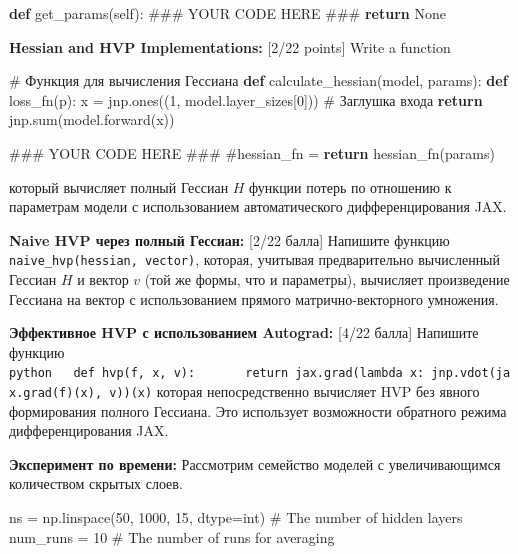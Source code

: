 \documentclass[
  russian,
  letterpaper,
  DIV=11,
  numbers=noendperiod]{scrartcl}
\newenvironment{Shaded}{\begin{snugshade}}{\end{snugshade}}
\newcommand{\AlertTok}[1]{\textcolor[rgb]{0.68,0.00,0.00}{#1}}
\newcommand{\BuiltInTok}[1]{\textcolor[rgb]{0.00,0.23,0.31}{#1}}
\newcommand{\CommentTok}[1]{\textcolor[rgb]{0.37,0.37,0.37}{#1}}
\newcommand{\ControlFlowTok}[1]{\textcolor[rgb]{0.00,0.23,0.31}{\textbf{#1}}}
\newcommand{\DecValTok}[1]{\textcolor[rgb]{0.68,0.00,0.00}{#1}}
\newcommand{\KeywordTok}[1]{\textcolor[rgb]{0.00,0.23,0.31}{\textbf{#1}}}
\newcommand{\NormalTok}[1]{\textcolor[rgb]{0.00,0.23,0.31}{#1}}
\newcommand{\OperatorTok}[1]{\textcolor[rgb]{0.37,0.37,0.37}{#1}}
\newcommand{\VariableTok}[1]{\textcolor[rgb]{0.07,0.07,0.07}{#1}}
\begin{document}
\begin{enumerate}
\begin{Shaded}
\begin{Highlighting}[]
    \KeywordTok{def}\NormalTok{ get\_params(}\VariableTok{self}\NormalTok{):}
        \CommentTok{\#\#\# YOUR CODE HERE }\AlertTok{\#\#\#}
        \ControlFlowTok{return} \VariableTok{None}
\end{Highlighting}
\end{Shaded}

  \textbf{Hessian and HVP Implementations:} {[}2/22 points{]} Write a
  function

\begin{Shaded}
\begin{Highlighting}[]
\CommentTok{\# Функция для вычисления Гессиана}
\KeywordTok{def}\NormalTok{ calculate\_hessian(model, params):}
    \KeywordTok{def}\NormalTok{ loss\_fn(p):}
\NormalTok{        x }\OperatorTok{=}\NormalTok{ jnp.ones((}\DecValTok{1}\NormalTok{, model.layer\_sizes[}\DecValTok{0}\NormalTok{]))  }\CommentTok{\# Заглушка входа}
        \ControlFlowTok{return}\NormalTok{ jnp.}\BuiltInTok{sum}\NormalTok{(model.forward(x))}

    \CommentTok{\#\#\# YOUR CODE HERE }\AlertTok{\#\#\#}
    \CommentTok{\#hessian\_fn =           }
    \ControlFlowTok{return}\NormalTok{ hessian\_fn(params)}
\end{Highlighting}
\end{Shaded}

  который вычисляет полный Гессиан \(H\) функции потерь по отношению к
  параметрам модели с использованием автоматического дифференцирования
  JAX.

  \textbf{Naive HVP через полный Гессиан:} {[}2/22 балла{]} Напишите
  функцию \texttt{naive\_hvp(hessian,\ vector)}, которая, учитывая
  предварительно вычисленный Гессиан \(H\) и вектор \(v\) (той же формы,
  что и параметры), вычисляет произведение Гессиана на вектор с
  использованием прямого матрично-векторного умножения.

  \textbf{Эффективное HVP с использованием Autograd:} {[}4/22 балла{]}
  Напишите функцию
  \texttt{python\ \ \ def\ hvp(f,\ x,\ v):\ \ \ \ \ \ \ return\ jax.grad(lambda\ x:\ jnp.vdot(jax.grad(f)(x),\ v))(x)}
  которая непосредственно вычисляет HVP без явного формирования полного
  Гессиана. Это использует возможности обратного режима
  дифференцирования JAX.

  \textbf{Эксперимент по времени:} Рассмотрим семейство моделей с
  увеличивающимся количеством скрытых слоев.

\begin{Shaded}
\begin{Highlighting}[]
\NormalTok{ns }\OperatorTok{=}\NormalTok{ np.linspace(}\DecValTok{50}\NormalTok{, }\DecValTok{1000}\NormalTok{, }\DecValTok{15}\NormalTok{, dtype}\OperatorTok{=}\BuiltInTok{int}\NormalTok{)  }\CommentTok{\# The number of hidden layers}
\NormalTok{num\_runs }\OperatorTok{=} \DecValTok{10}  \CommentTok{\# The number of runs for averaging}
\end{Highlighting}
\end{Shaded}


\end{enumerate}
\end{document}
